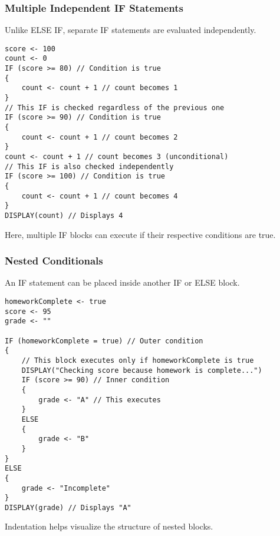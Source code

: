 \documentclass[11pt,oneside]{book}
\begin{document}
\subsubsection*{Multiple Independent IF Statements}
Unlike ELSE IF, separate IF statements are evaluated independently.
\begin{lstlisting}[language=APCSP, label={lst:multiple_if}, caption={AP Pseudocode: Multiple Independent IFs}]
score <- 100
count <- 0
IF (score >= 80) // Condition is true
{
    count <- count + 1 // count becomes 1
}
// This IF is checked regardless of the previous one
IF (score >= 90) // Condition is true
{
    count <- count + 1 // count becomes 2
}
count <- count + 1 // count becomes 3 (unconditional)
// This IF is also checked independently
IF (score >= 100) // Condition is true
{
    count <- count + 1 // count becomes 4
}
DISPLAY(count) // Displays 4
\end{lstlisting}
Here, multiple IF blocks can execute if their respective conditions are true.

\subsubsection*{Nested Conditionals}
An IF statement can be placed inside another IF or ELSE block.
\begin{lstlisting}[language=APCSP, label={lst:nested_if}, caption={AP Pseudocode: Nested IFs}]
homeworkComplete <- true
score <- 95
grade <- ""

IF (homeworkComplete = true) // Outer condition
{
    // This block executes only if homeworkComplete is true
    DISPLAY("Checking score because homework is complete...")
    IF (score >= 90) // Inner condition
    {
        grade <- "A" // This executes
    }
    ELSE
    {
        grade <- "B"
    }
}
ELSE
{
    grade <- "Incomplete"
}
DISPLAY(grade) // Displays "A"
\end{lstlisting}
Indentation helps visualize the structure of nested blocks.
\end{document}
